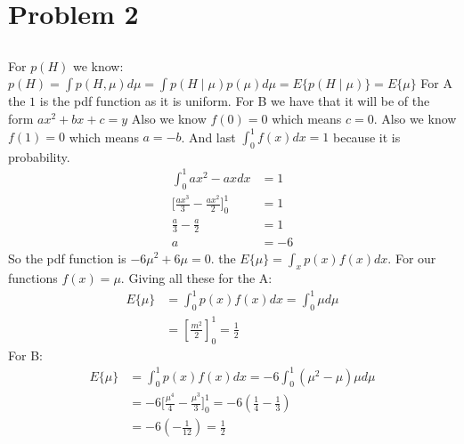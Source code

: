 \section{Problem 2}
\subsection{}
For $p(H)$ we know:
$p(H) = \int p(H,\mu) d\mu = \int p(H\mid\mu)p(\mu)d\mu = E\{p(H\mid\mu)\} = E\{\mu\}$
For A the $1$ is the pdf function as it is uniform.
For B we have that it will be of the form $ax^2+bx+c=y$
Also we know $f(0)=0$ which means $c=0$.
Also we know $f(1)=0$ which means $a=-b$.
And last $\int_0^1f(x)dx =1$ because it is probability.
\begin{align*}
\int_0^1ax^2-axdx &= 1 \\
\Big[ \frac{ax^3}{3} - \frac{ax^2}{2}\Big]_0^1 &=1 \\
\frac{a}{3} - \frac{a}{2} &= 1 \\
a &= -6
\end{align*}
So the pdf function is $-6\mu^2+6\mu=0$.
the $E\{\mu\} = \int_xp(x)f(x)dx$.
For our functions $f(x) = \mu$.
Giving all these for the A:
\begin{align*}
E\{\mu\} &= \int_{0}^{1} p(x)f(x) dx
=\int_{0}^{1}\mu d\mu \\
&=[\frac{m^2}{2}]_0^1
=\frac{1}{2} 
\end{align*}
For B:
\begin{align*}
E\{\mu\} &= \int_{0}^{1}p(x)f(x)dx
=-6\int_{0}^{1} (\mu^2-\mu)\mu d\mu \\
&=-6\Big[ \frac{\mu^4}{4}-\frac{\mu^3}{3}\Big]_0^1
=-6(\frac{1}{4}-\frac{1}{3}) \\
&=-6(-\frac{1}{12})
=\frac{1}{2}
\end{align*}
